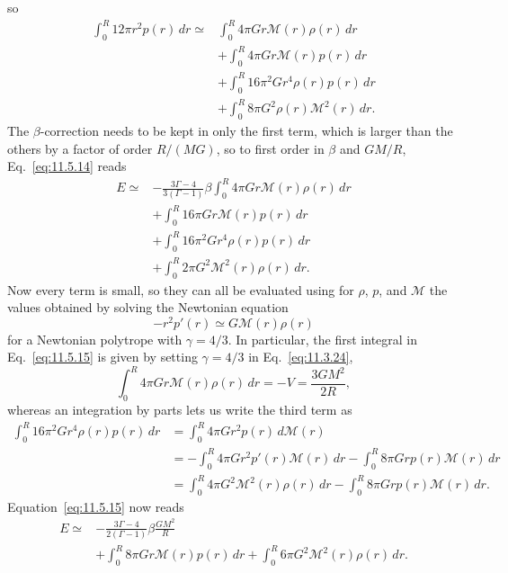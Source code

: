 so
\[
  \begin{aligned}
  \int_0^R12\pi r^2p(r)\,dr
  \simeq{}&
  \int_0^R4\pi Gr\mathcal{M}(r)\rho(r)\,dr\\
  &+\int_0^R4\pi Gr\mathcal{M}(r)p(r)\,dr\\
  &+\int_0^R16\pi^2Gr^4\rho(r)p(r)\,dr\\
  &+\int_0^R8\pi G^2\rho(r)\mathcal{M}^2(r)\,dr.
  \end{aligned}
\]
The \(\beta\)-correction needs to be kept in only the first term, which is
larger than the others by a factor of order \(R/(MG)\), so to first order in
\(\beta\) and \(GM/R\), Eq.~\eqref{eq:11.5.14} reads
\begin{equation}
  \begin{aligned}
  E\simeq{}&
  -\frac{3\Gamma-4}{3(\Gamma-1)}\beta
  \int_0^R4\pi Gr\mathcal{M}(r)\rho(r)\,dr\\
  &+\int_0^R16\pi Gr\mathcal{M}(r)p(r)\,dr\\
  &+\int_0^R16\pi^2Gr^4\rho(r)p(r)\,dr\\
  &+\int_0^R2\pi G^2\mathcal{M}^2(r)\rho(r)\,dr.
  \end{aligned}
  \tag{11.5.15}\label{eq:11.5.15}
\end{equation}
Now every term is small, so they can all be evaluated using for \(\rho\),
\(p\), and \(\mathcal{M}\) the values obtained by solving the Newtonian
equation
\[
  -r^2p'(r)\simeq G\mathcal{M}(r)\rho(r)
\]
for a Newtonian polytrope with \(\gamma=4/3\). In particular, the first
integral in Eq.~\eqref{eq:11.5.15} is given by setting \(\gamma=4/3\) in
Eq.~\eqref{eq:11.3.24},
\[
  \int_0^R4\pi Gr\mathcal{M}(r)\rho(r)\,dr
  =
  -V
  =
  \frac{3GM^2}{2R},
\]
whereas an integration by parts lets us write the third term as
\[
  \begin{aligned}
  \int_0^R16\pi^2Gr^4\rho(r)p(r)\,dr
  &=
  \int_0^R4\pi Gr^2p(r)\,d\mathcal{M}(r)\\
  &=
  -\int_0^R4\pi Gr^2p'(r)\mathcal{M}(r)\,dr
  -\int_0^R8\pi Grp(r)\mathcal{M}(r)\,dr\\
  &=
  \int_0^R4\pi G^2\mathcal{M}^2(r)\rho(r)\,dr
  -\int_0^R8\pi Grp(r)\mathcal{M}(r)\,dr.
  \end{aligned}
\]
Equation~\eqref{eq:11.5.15} now reads
\[
  \begin{aligned}
  E\simeq{}&
  -\frac{3\Gamma-4}{2(\Gamma-1)}\beta\frac{GM^2}{R}\\
  &+\int_0^R8\pi Gr\mathcal{M}(r)p(r)\,dr
  +\int_0^R6\pi G^2\mathcal{M}^2(r)\rho(r)\,dr.
  \end{aligned}
\]
